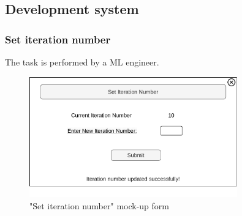 \subsection{Development system}

\subsubsection{Set iteration number}

The task is performed by a ML engineer.

\begin{figure}[H]
\centering
\includegraphics[width=0.8\textwidth]{figures/set_iteration_number.pdf}
\caption{"Set iteration number" mock-up form}
\end{figure}


